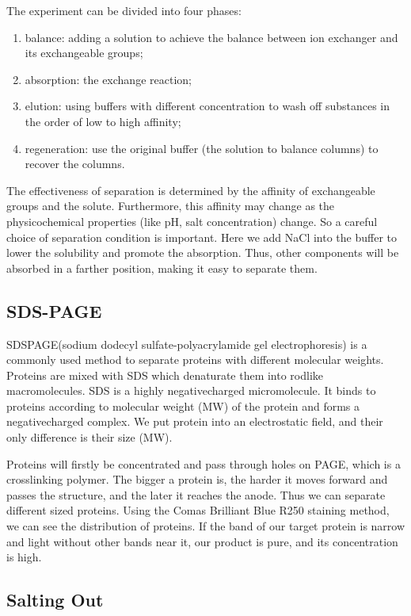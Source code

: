 The experiment can be divided into four phases:
\begin{enumerate}
\item balance: adding a solution to achieve the balance between ion exchanger and its exchangeable groups;
\item absorption: the exchange reaction;
\item elution: using buffers with different concentration to wash off substances in the order of low to high  affinity;
\item regeneration: use the original buffer (the solution to balance columns) to recover the columns.
\end{enumerate}

The effectiveness of separation is determined by the affinity of exchangeable groups and the solute. Furthermore, this affinity may change as the physicochemical properties (like pH,
salt concentration) change. So a careful choice of separation condition is important. Here
we add NaCl into the buffer to lower the solubility and promote the absorption. Thus, other
components will be absorbed in a farther position, making it easy to separate them.


\subsection{SDS-PAGE}

SDS­PAGE(sodium dodecyl sulfate-polyacrylamide gel electrophoresis) is a commonly
used method to separate proteins with different molecular weights. Proteins are mixed with
SDS which denaturate them into rodlike macromolecules. SDS is a highly negative­charged
micromolecule. It binds to proteins according to molecular weight (MW) of the protein and
forms a negative­charged complex. We put protein into an electrostatic field, and their only
difference is their size (MW).

Proteins will firstly be concentrated and pass through holes on PAGE, which is a crosslink­ing polymer. The bigger a protein is, the harder it moves forward and passes the structure, and
the later it reaches the anode. Thus we can separate different sized proteins. Using the Comas
Brilliant Blue R250 staining method, we can see the distribution of proteins. If the band of
our target protein is narrow and light without other bands near it, our product is pure, and its
concentration is high.

\subsection{Salting Out}

